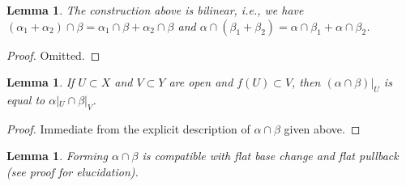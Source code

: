 \documentclass{stacks-project}
\theoremstyle{plain}
\newtheorem{lemma}[subsection]{Lemma}
\theoremstyle{definition}
\theoremstyle{remark}
\numberwithin{equation}{subsection}
\begin{document}
\begin{lemma}
\label{lemma-action-bilinear}
The construction above is bilinear, i.e., we have
$(\alpha_1 + \alpha_2) \cap \beta = \alpha_1 \cap \beta +
\alpha_2 \cap \beta$ and $\alpha \cap (\beta_1 + \beta_2) =
\alpha \cap \beta_1 + \alpha \cap \beta_2$.
\end{lemma}

\begin{proof}
Omitted.
\end{proof}

\begin{lemma}
\label{lemma-action-opens}
If $U \subset X$ and $V \subset Y$ are open and $f(U) \subset V$, then
$(\alpha \cap \beta)|_U$ is equal to $\alpha|_U \cap \beta|_V$.
\end{lemma}

\begin{proof}
Immediate from the explicit description of $\alpha \cap \beta$
given above.
\end{proof}

\begin{lemma}
\label{lemma-action-base-change}
Forming $\alpha \cap \beta$ is compatible with flat base change
and flat pullback (see proof for elucidation).
\end{lemma}
\end{document}
